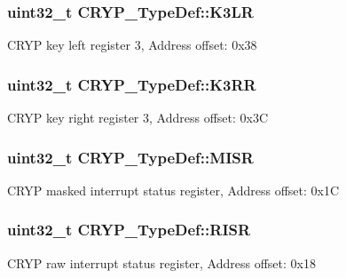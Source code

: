 \subsubsection[{\texorpdfstring{K3\+LR}{K3LR}}]{ uint32\+\_\+t C\+R\+Y\+P\+\_\+\+Type\+Def\+::\+K3\+LR}\hypertarget{struct_c_r_y_p___type_def_a39e099c27b2be81a03c09810f390454b}{}\label{struct_c_r_y_p___type_def_a39e099c27b2be81a03c09810f390454b}
C\+R\+YP key left register 3, Address offset\+: 0x38 
\subsubsection[{\texorpdfstring{K3\+RR}{K3RR}}]{ uint32\+\_\+t C\+R\+Y\+P\+\_\+\+Type\+Def\+::\+K3\+RR}\hypertarget{struct_c_r_y_p___type_def_a1c3230419aed39ab61263b87547cbc3e}{}\label{struct_c_r_y_p___type_def_a1c3230419aed39ab61263b87547cbc3e}
C\+R\+YP key right register 3, Address offset\+: 0x3C 
\subsubsection[{\texorpdfstring{M\+I\+SR}{MISR}}]{ uint32\+\_\+t C\+R\+Y\+P\+\_\+\+Type\+Def\+::\+M\+I\+SR}\hypertarget{struct_c_r_y_p___type_def_aa807ff93c7ce98e9d13cbc52d245770f}{}\label{struct_c_r_y_p___type_def_aa807ff93c7ce98e9d13cbc52d245770f}
C\+R\+YP masked interrupt status register, Address offset\+: 0x1C 
\subsubsection[{\texorpdfstring{R\+I\+SR}{RISR}}]{ uint32\+\_\+t C\+R\+Y\+P\+\_\+\+Type\+Def\+::\+R\+I\+SR}\hypertarget{struct_c_r_y_p___type_def_a04be1b2f14a37aed1deff4d57e6261dd}{}\label{struct_c_r_y_p___type_def_a04be1b2f14a37aed1deff4d57e6261dd}
C\+R\+YP raw interrupt status register, Address offset\+: 0x18 
